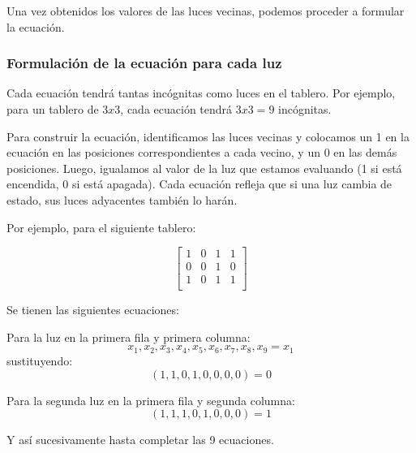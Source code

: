 \documentclass{article}
\begin{document}
    Una vez obtenidos los valores de las luces vecinas, podemos proceder a formular la ecuación.
    
    \subsubsection*{Formulación de la ecuación para cada luz}
    
    Cada ecuación tendrá tantas incógnitas como luces en el tablero. Por ejemplo, para un tablero de $3x3$, cada ecuación tendrá $3x3 = 9$ incógnitas.
    
    Para construir la ecuación, identificamos las luces vecinas y colocamos un 1 en la ecuación en las posiciones correspondientes a cada vecino, y un 0 en las demás posiciones. Luego, igualamos al valor de la luz que estamos evaluando (1 si está encendida, 0 si está apagada). Cada ecuación refleja que si una luz cambia de estado, sus luces adyacentes también lo harán.
    
    Por ejemplo, para el siguiente tablero:
    
    \[
    \begin{bmatrix}
        1 & 0 & 1 & 1 \\
        0 & 0 & 1 & 0 \\
        1 & 0 & 1 & 1 \\
    \end{bmatrix}
    \]
    
    Se tienen las siguientes ecuaciones:
    
    Para la luz en la primera fila y primera columna:
    \[x_1, x_2, x_3, x_4, x_5, x_6, x_7, x_8, x_9 = x_1\]
    sustituyendo:
    \[(1, 1, 0, 1, 0, 0, 0, 0) = 0\]
    
    Para la segunda luz en la primera fila y segunda columna:
    \[(1, 1, 1, 0, 1, 0, 0, 0) = 1\]
    
    Y así sucesivamente hasta completar las 9 ecuaciones.

    

\nocite{*}


\newpage


\end{document}
